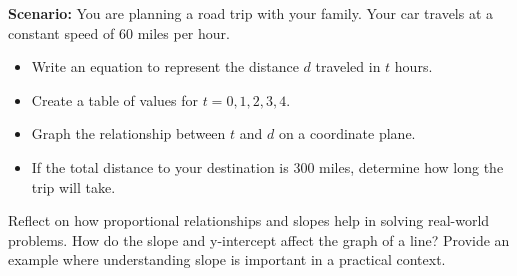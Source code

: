 \documentclass[12pt]{article}
\begin{document}
\begin{tcolorbox}[colframe=black!60, colback=white, 
coltitle=black, colbacktitle=black!15, fonttitle=\bfseries\Large, 
title=Performance Task: Planning a Road Trip, halign title=center, left=10pt, right=10pt, top=10pt, bottom=50pt]
\textbf{Scenario:} You are planning a road trip with your family. Your car travels at a constant speed of 60 miles per hour.
\begin{itemize}
    \item Write an equation to represent the distance \(d\) traveled in \(t\) hours.
    \item Create a table of values for \(t = 0, 1, 2, 3, 4\).
    \item Graph the relationship between \(t\) and \(d\) on a coordinate plane.
    \item If the total distance to your destination is 300 miles, determine how long the trip will take.
\end{itemize}
\end{tcolorbox}

\begin{tcolorbox}[colframe=black!60, colback=white, 
coltitle=black, colbacktitle=black!15, fonttitle=\bfseries\Large, 
title=Reflection, halign title=center, left=10pt, right=10pt, top=10pt, bottom=80pt]
Reflect on how proportional relationships and slopes help in solving real-world problems. How do the slope and y-intercept affect the graph of a line? Provide an example where understanding slope is important in a practical context.
\end{tcolorbox}
\end{document}
